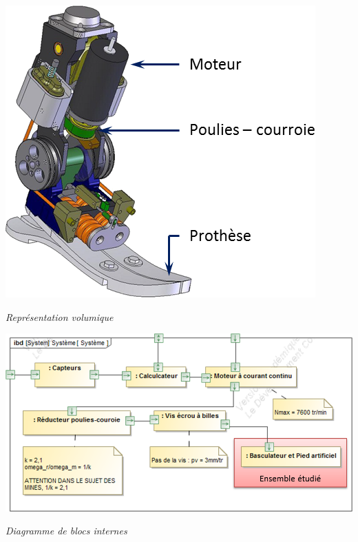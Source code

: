 \documentclass[10pt]{article}
\begin{document}
\begin{minipage}[c]{.3\linewidth}
\begin{center}
\includegraphics[width=\textwidth]{images/prot_02}

\textit{Représentation volumique}
\end{center}
\end{minipage}
 \hfill
\begin{minipage}[c]{.65\linewidth}
\begin{center}
\includegraphics[width=\textwidth]{images/Systeme}

\textit{Diagramme de blocs internes}
\end{center}
\end{minipage}
\end{document}
